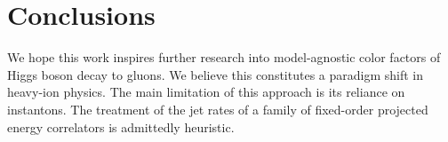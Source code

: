 \section{Conclusions}\label{sec:conclusions}

We hope this work inspires further research into model-agnostic color
factors of Higgs boson decay to gluons. We believe this constitutes a
paradigm shift in heavy-ion physics. The main limitation of this
approach is its reliance on instantons. The treatment of the jet rates
of a family of fixed-order projected energy correlators is admittedly
heuristic.


